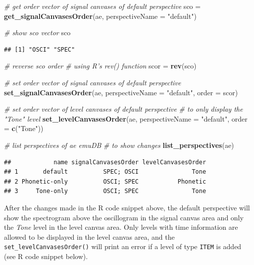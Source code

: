 \documentclass[]{book}
\newenvironment{Shaded}{\begin{snugshade}}{\end{snugshade}}
\newcommand{\CommentTok}[1]{\textcolor[rgb]{0.56,0.35,0.01}{\textit{#1}}}
\newcommand{\DataTypeTok}[1]{\textcolor[rgb]{0.13,0.29,0.53}{#1}}
\newcommand{\KeywordTok}[1]{\textcolor[rgb]{0.13,0.29,0.53}{\textbf{#1}}}
\newcommand{\NormalTok}[1]{#1}
\newcommand{\StringTok}[1]{\textcolor[rgb]{0.31,0.60,0.02}{#1}}
\begin{document}
\begin{Shaded}
\begin{Highlighting}[]
\CommentTok{# get order vector of signal canvases of default perspective}
\NormalTok{sco =}\StringTok{ }\KeywordTok{get_signalCanvasesOrder}\NormalTok{(ae,}
                              \DataTypeTok{perspectiveName =} \StringTok{"default"}\NormalTok{)}

\CommentTok{# show sco vector}
\NormalTok{sco}
\end{Highlighting}
\end{Shaded}

\begin{verbatim}
## [1] "OSCI" "SPEC"
\end{verbatim}

\begin{Shaded}
\begin{Highlighting}[]
\CommentTok{# reverse sco order}
\CommentTok{# using R's rev() function}
\NormalTok{scor =}\StringTok{ }\KeywordTok{rev}\NormalTok{(sco)}

\CommentTok{# set order vector of signal canvases of default perspective}
\KeywordTok{set_signalCanvasesOrder}\NormalTok{(ae,}
                        \DataTypeTok{perspectiveName =} \StringTok{"default"}\NormalTok{,}
                        \DataTypeTok{order =}\NormalTok{ scor)}

\CommentTok{# set order vector of level canvases of default perspective}
\CommentTok{# to only display the "Tone" level}
\KeywordTok{set_levelCanvasesOrder}\NormalTok{(ae,}
                       \DataTypeTok{perspectiveName =} \StringTok{"default"}\NormalTok{,}
                       \DataTypeTok{order =} \KeywordTok{c}\NormalTok{(}\StringTok{"Tone"}\NormalTok{))}

\CommentTok{# list perspectives of ae emuDB}
\CommentTok{# to show changes}
\KeywordTok{list_perspectives}\NormalTok{(ae)}
\end{Highlighting}
\end{Shaded}

\begin{verbatim}
##            name signalCanvasesOrder levelCanvasesOrder
## 1       default          SPEC; OSCI               Tone
## 2 Phonetic-only          OSCI; SPEC           Phonetic
## 3     Tone-only          OSCI; SPEC               Tone
\end{verbatim}

After the changes made in the R code snippet above, the default perspective will show the spectrogram above the oscillogram in the signal canvas area and only the \emph{Tone} level in the level canvas area. Only levels with time information are allowed to be displayed in the level canvas area, and the \texttt{set\_levelCanvasesOrder()} will print an error if a level of type \texttt{ITEM} is added (see R code snippet below).
\end{document}
